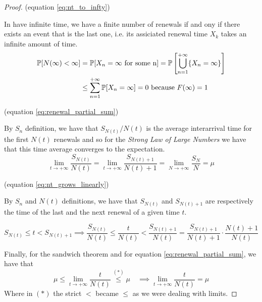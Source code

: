 \begin{proof}
	\proofpart (equation \ref{eq:nt_to_infty})

	In have infinite time, we have a finite number of renewals if and ony if there exists an event that is the last one, i.e. its assiciated renewal time $X_k$ takes an infinite amount of time.
	\begin{equation*}
		\begin{split}
			\mathbb{P}[N(\infty)<\infty] &= \mathbb{P}[X_n = \infty \text{ for some n}] = \mathbb{P} \left[ \bigcup\limits_{n=1}^{+\infty}\{X_n = \infty \} \right] \\
			&\le \sum\limits_{n=1}^{+\infty}\mathbb{P}[X_n = \infty] = 0 \text{~because~} F(\infty)=1
		\end{split}
	\end{equation*}

	\proofpart (equation \ref{eq:renewal_partial_sum})

	By $S_n$ definition, we have that $ S_{N(t)} / N(t)$ is the average interarrival time for the first $N(t)$ renewals and so for the \emph{Strong Law of Large Numbers} we have that this time average converges to the expectation.
	$$ \lim_{t \to +\infty} \frac{S_{N(t)}}{N(t)} = \lim_{t \to +\infty} \frac{S_{N(t)+1}}{N(t)+1} = \lim_{N \to +\infty} \frac{S_{N}}{N} = \mu $$

	\proofpart (equation \ref{eq:nt_grows_linearly})

	By $S_n$ and $N(t)$ definitions, we have that $S_{N(t)}$ and $S_{N(t)+1}$ are respectively the time of the last and the next renewal of a given time $t$.

	\begin{equation*}
			S_{N(t)} \le t < S_{N(t)+1} \implies
			\frac{S_{N(t)}}{N(t)} \le \frac{t}{N(t)} < \frac{S_{N(t)+1}}{N(t)} =\frac{S_{N(t)+1}}{N(t)+1} \cdot \frac{N(t)+1}{N(t)}
	\end{equation*}

	Finally, for the sandwich theorem and for equation \ref{eq:renewal_partial_sum}, we have that
	$$ \mu \le \lim_{t \to +\infty} \frac{t}{N(t)} \stackrel{(*)}{\le}\mu \quad \implies \lim_{t \to +\infty} \frac{t}{N(t)} = \mu $$
	Where in $(*)$ the strict $<$ became $\le$ as we were dealing with limits.
\end{proof}


